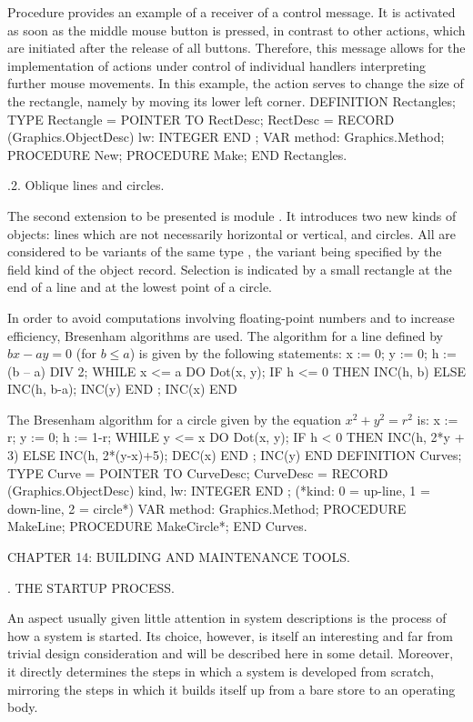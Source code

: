 Procedure  provides an example of a receiver of a control message. It is activated as soon as the middle mouse button is pressed, in contrast to other actions, which are initiated after the release of all buttons. Therefore, this message allows for the implementation of actions under control of individual handlers interpreting further mouse movements. In this example, the action serves to change the size of the rectangle, namely by moving its lower left corner.
\begintt
DEFINITION Rectangles;
TYPE Rectangle = POINTER TO RectDesc;
RectDesc = RECORD (Graphics.ObjectDesc) lw: INTEGER
END ;
VAR method: Graphics.Method;
PROCEDURE New;
PROCEDURE Make; END Rectangles.
\endtt

.2. Oblique lines and circles.

The second extension to be presented is module . It introduces two new kinds of objects: lines which are not necessarily horizontal or vertical, and circles. All are considered to be variants of the same type , the variant being specified by the field kind of the object record. Selection is indicated by a small rectangle at the end of a line and at the lowest point of a circle.

In order to avoid computations involving floating-point numbers and to increase efficiency, Bresenham algorithms are used. The algorithm for a line defined by $bx - ay = 0$ (for $b \le a$) is given by the following statements:
\begintt
x := 0; y := 0; h := (b – a) DIV 2; WHILE x <= a DO Dot(x, y);
IF h <= 0 THEN INC(h, b) ELSE INC(h, b-a); INC(y) END ;
INC(x) END
\endtt

The Bresenham algorithm for a circle given by the equation $x^2 + y^2 = r^2$ is:
\begintt
x := r; y := 0; h := 1-r; WHILE y <= x DO Dot(x, y);
IF h < 0 THEN INC(h, 2*y + 3) ELSE INC(h, 2*(y-x)+5); DEC(x) END ;
INC(y) END
DEFINITION Curves;
TYPE Curve = POINTER TO CurveDesc;
CurveDesc = RECORD (Graphics.ObjectDesc) kind, lw: INTEGER
END ;
(*kind: 0 = up-line, 1 = down-line, 2 = circle*)
VAR method: Graphics.Method; PROCEDURE MakeLine; PROCEDURE MakeCircle*;
END Curves.
\endtt

\beginchapter CHAPTER 14: BUILDING AND MAINTENANCE TOOLS.

. THE STARTUP PROCESS.

An aspect usually given little attention in system descriptions is the process of how a system is started. Its choice, however, is itself an interesting and far from trivial design consideration and will be described here in some detail. Moreover, it directly determines the steps in which a system is developed from scratch, mirroring the steps in which it builds itself up from a bare store to an operating body.

